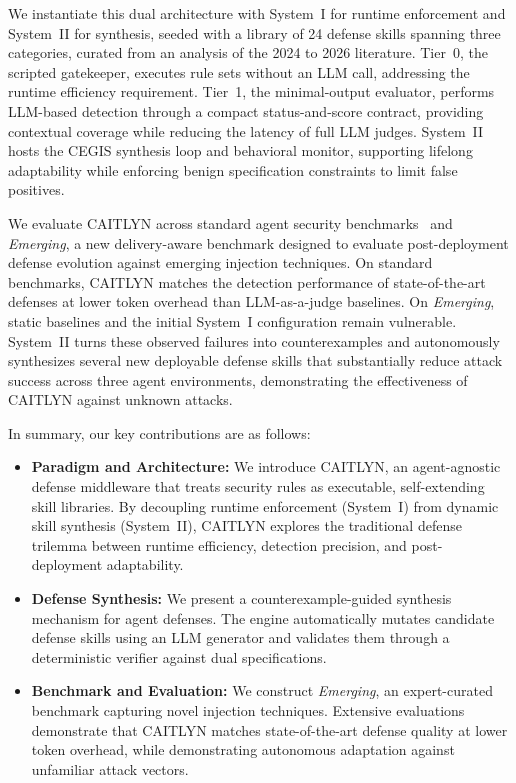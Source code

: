 We instantiate this dual architecture with System~I for runtime
enforcement and System~II for synthesis, seeded with a library of 24
defense skills spanning three categories, curated from an analysis of
the 2024 to 2026 literature. Tier~0, the scripted gatekeeper, executes
rule sets without an LLM call, addressing
the runtime efficiency requirement. Tier~1, the minimal-output
evaluator, performs LLM-based detection through a compact
status-and-score contract, providing contextual coverage while reducing the
latency of full LLM judges. System~II hosts the CEGIS synthesis loop
and behavioral monitor, supporting lifelong adaptability while
enforcing benign specification constraints to limit false positives.

We evaluate CAITLYN across standard agent security
benchmarks~\cite{agentdojo,aspi,safeclawbench} and
\emph{Emerging}, a new delivery-aware benchmark designed to evaluate
post-deployment defense evolution against emerging injection
techniques. On standard benchmarks, CAITLYN matches the detection
performance of state-of-the-art defenses at lower token overhead than
LLM-as-a-judge baselines. On \emph{Emerging}, static baselines and
the initial System~I configuration remain vulnerable. System~{II}
turns these observed failures into counterexamples and autonomously
synthesizes several new deployable defense skills that substantially reduce
attack success across three agent environments, demonstrating the
effectiveness of CAITLYN against unknown attacks.


In summary, our key contributions are as follows:
\begin{itemize}[nosep]
    \item \textbf{Paradigm and Architecture:} We introduce CAITLYN, an
      agent-agnostic defense middleware that treats security rules as
      executable, self-extending skill libraries. By decoupling runtime
      enforcement (System~I) from dynamic skill synthesis (System~II),
      CAITLYN explores the traditional defense trilemma between runtime
      efficiency, detection precision, and post-deployment adaptability.
  \item \textbf{Defense Synthesis:} We present a
  counterexample-guided synthesis mechanism for agent defenses. The
  engine automatically mutates candidate defense skills using an LLM generator and
  validates them through a deterministic verifier against dual
  specifications.
  \item \textbf{Benchmark and Evaluation:} We construct
    \emph{Emerging}, an expert-curated benchmark capturing novel
    injection techniques. Extensive evaluations demonstrate
    that CAITLYN matches state-of-the-art defense quality at
    lower token overhead, while demonstrating autonomous
    adaptation against unfamiliar attack vectors.
\end{itemize}

